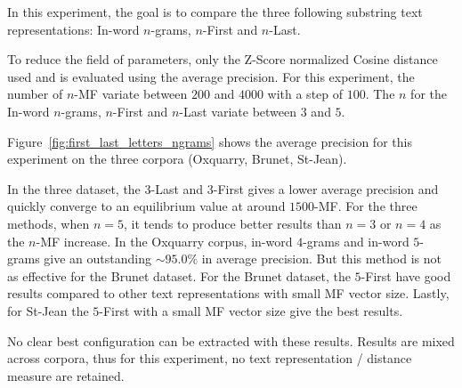In this experiment, the goal is to compare the three following substring text representations: In-word $n$-grams, $n$-First and $n$-Last.

To reduce the field of parameters, only the Z-Score normalized Cosine distance used and is evaluated using the average precision.
For this experiment, the number of $n$-MF variate between $200$ and $4000$ with a step of $100$.
The $n$ for the In-word $n$-grams, $n$-First and $n$-Last variate between $3$ and $5$.

Figure~\ref{fig:first_last_letters_ngrams} shows the average precision for this experiment on the three corpora (Oxquarry, Brunet, St-Jean).

In the three dataset, the $3$-Last and $3$-First gives a lower average precision and quickly converge to an equilibrium value at around $1500$-MF.
For the three methods, when $n = 5$, it tends to produce better results than $n = 3$ or $n = 4$ as the $n$-MF increase.
In the Oxquarry corpus, in-word $4$-grams and in-word $5$-grams give an outstanding $\sim 95.0\%$ in average precision.
But this method is not as effective for the Brunet dataset.
For the Brunet dataset, the $5$-First have good results compared to other text representations with small MF vector size.
Lastly, for St-Jean the $5$-First with a small MF vector size give the best results.

No clear best configuration can be extracted with these results.
Results are mixed across corpora, thus for this experiment, no text representation / distance measure are retained.

